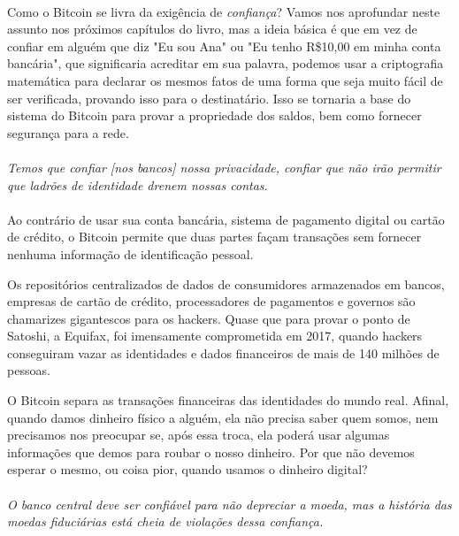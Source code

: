 \paragraph{}
Como o Bitcoin se livra da exigência de \textit{confiança}? Vamos nos aprofundar neste assunto nos próximos capítulos do livro, mas a ideia básica é que em vez de confiar em alguém que diz "Eu sou Ana" ou "Eu tenho R\$10,00 em minha conta bancária", que significaria acreditar em sua palavra, podemos usar a criptografia matemática para declarar os mesmos fatos de uma forma que seja muito fácil de ser verificada, provando isso para o destinatário. Isso se tornaria a base do sistema do Bitcoin para provar a propriedade dos saldos, bem como fornecer segurança para a rede.
\paragraph{}
\textit{Temos que confiar [nos bancos] nossa privacidade, confiar que não irão permitir que ladrões de identidade drenem nossas contas.}
\paragraph{}
Ao contrário de usar sua conta bancária, sistema de pagamento digital ou cartão de crédito, o Bitcoin permite que duas partes façam transações sem fornecer nenhuma informação de identificação pessoal.

Os repositórios centralizados de dados de consumidores armazenados em bancos, empresas de cartão de crédito, processadores de pagamentos e governos são chamarizes gigantescos para os hackers. Quase que para provar o ponto de Satoshi, a Equifax, foi imensamente comprometida em 2017, quando hackers conseguiram vazar as identidades e dados financeiros de mais de 140 milhões de pessoas.

O Bitcoin separa as transações financeiras das identidades do mundo real. Afinal, quando damos dinheiro físico a alguém, ela não precisa saber quem somos, nem precisamos nos preocupar se, após essa troca, ela poderá usar algumas informações que demos para roubar o nosso dinheiro. Por que não devemos esperar o mesmo, ou coisa pior, quando usamos o dinheiro digital?

\paragraph{}
\textit{O banco central deve ser confiável para não depreciar a moeda, mas a história das moedas fiduciárias está cheia de violações dessa confiança.}
